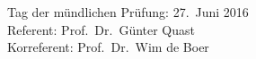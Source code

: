 \begin{titlepage}
\begin{center}
    \end{center}
\vspace{\fill}
Tag der mündlichen Prüfung: 27.\ Juni 2016\\[1.5ex]
Referent: Prof.\ Dr.\ Günter Quast\\[0.5ex]
Korreferent: Prof.\ Dr.\ Wim de Boer



\end{titlepage}
\cleardoublepage


